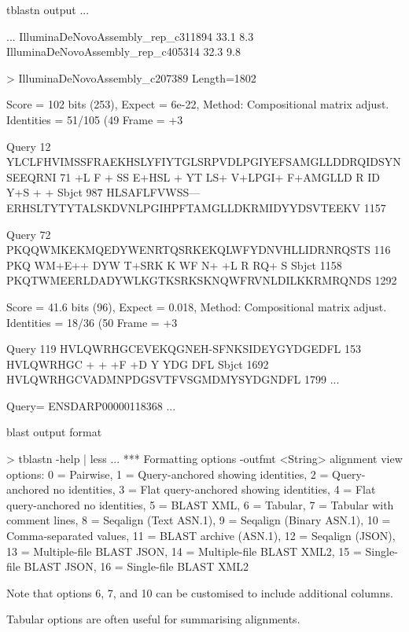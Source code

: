 \documentclass[pdf]{beamer}
\begin{document}
\begin{frame}[fragile]{tblastn output ...}
  \begin{consolecode}
...
IlluminaDeNovoAssembly_rep_c311894                                  33.1  8.3  
IlluminaDeNovoAssembly_rep_c405314                                  32.3  9.8  

> IlluminaDeNovoAssembly_c207389
Length=1802

 Score = 102 bits (253),  Expect = 6e-22, Method: Compositional matrix adjust.
 Identities = 51/105 (49%
 Frame = +3

Query  12    YLCLFHVIMSSFRAEKHSLYFIYTGLSRPVDLPGIYEFSAMGLLDDRQIDSYNSEEQRNI  71
             +L  F  + SS   E+HSL + YT LS+ V+LPGI+ F+AMGLLD R ID Y+S  +  +
Sbjct  987   HLSAFLFVWSS---ERHSLTYTYTALSKDVNLPGIHPFTAMGLLDKRMIDYYDSVTEEKV  1157

Query  72    PKQQWMKEKMQEDYWENRTQSRKEKQLWFYDNVHLLIDRNRQSTS  116
             PKQ WM+E++  DYW   T+SRK K  WF  N+ +L  R RQ+ S
Sbjct  1158  PKQTWMEERLDADYWLKGTKSRKSKNQWFRVNLDILKKRMRQNDS  1292


 Score = 41.6 bits (96),  Expect = 0.018, Method: Compositional matrix adjust.
 Identities = 18/36 (50%
 Frame = +3

Query  119   HVLQWRHGCEVEKQGNEH-SFNKSIDEYGYDGEDFL  153
             HVLQWRHGC  +   +   +F   +D Y YDG DFL
Sbjct  1692  HVLQWRHGCVADMNPDGSVTFVSGMDMYSYDGNDFL  1799
...

Query= ENSDARP00000118368
...
  \end{consolecode}
\end{frame}

\begin{frame}[fragile]{blast output format}
  \begin{consolecode}
    > tblastn -help | less
    ...
     *** Formatting options
     -outfmt <String>
     alignment view options:
       0 = Pairwise,
       1 = Query-anchored showing identities,
       2 = Query-anchored no identities,
       3 = Flat query-anchored showing identities,
       4 = Flat query-anchored no identities,
       5 = BLAST XML,
       6 = Tabular,
       7 = Tabular with comment lines,
       8 = Seqalign (Text ASN.1),
       9 = Seqalign (Binary ASN.1),
       10 = Comma-separated values,
       11 = BLAST archive (ASN.1),
       12 = Seqalign (JSON),
       13 = Multiple-file BLAST JSON,
       14 = Multiple-file BLAST XML2,
       15 = Single-file BLAST JSON,
       16 = Single-file BLAST XML2
  \end{consolecode}
  
  \footnotesize Note that options 6, 7, and 10 can be customised to include
  additional columns.
  
  \footnotesize Tabular options are often useful for summarising alignments.
\end{frame}
\end{document}
